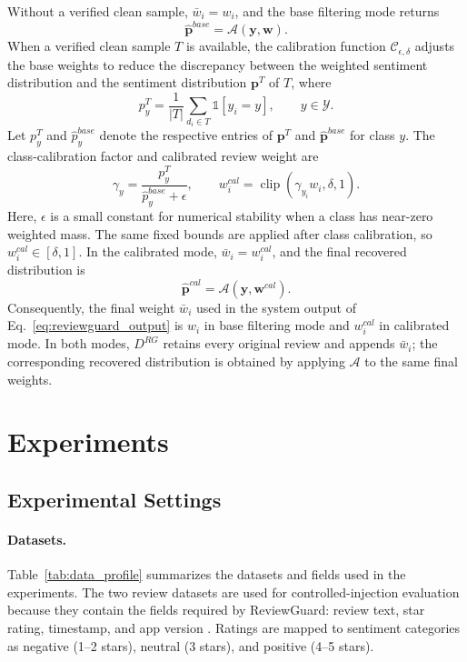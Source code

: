 \documentclass[runningheads]{llncs}
\begin{document}
Without a verified clean sample, \(\bar{w}_i=w_i\), and the base filtering mode returns
\[
\hat{\mathbf{p}}^{base}=\mathcal{A}(\mathbf{y},\mathbf{w}).
\]
When a verified clean sample \(T\) is available, the calibration function \(\mathcal{C}_{\epsilon,\delta}\) adjusts the base weights to reduce the discrepancy between the weighted sentiment distribution and the sentiment distribution \(\mathbf{p}^{T}\) of \(T\), where
\[
p_y^{T}=\frac{1}{|T|}\sum_{d_i\in T}\mathbb{1}[y_i=y],
\qquad y\in\mathcal{Y}.
\]
Let \(p_y^{T}\) and \(\hat{p}^{base}_y\) denote the respective entries of \(\mathbf{p}^{T}\) and \(\hat{\mathbf{p}}^{base}\) for class \(y\). The class-calibration factor and calibrated review weight are
\[
\gamma_y=\frac{p_y^{T}}{\hat{p}^{base}_y+\epsilon},
\qquad
w_i^{cal}=\operatorname{clip}(\gamma_{y_i}w_i,\delta,1).
\]
Here, \(\epsilon\) is a small constant for numerical stability when a class has near-zero weighted mass. The same fixed bounds are applied after class calibration, so \(w_i^{cal}\in[\delta,1]\). In the calibrated mode, \(\bar{w}_i=w_i^{cal}\), and the final recovered distribution is
\[
\hat{\mathbf{p}}^{cal}
=\mathcal{A}(\mathbf{y},\mathbf{w}^{cal}).
\]
Consequently, the final weight \(\bar{w}_i\) used in the system output of Eq.~\ref{eq:reviewguard_output} is \(w_i\) in base filtering mode and \(w_i^{cal}\) in calibrated mode. In both modes, \(D^{RG}\) retains every original review and appends \(\bar{w}_i\); the corresponding recovered distribution is obtained by applying \(\mathcal{A}\) to the same final weights.

\section{Experiments}

\subsection{Experimental Settings}

\paragraph{Datasets.}
Table~\ref{tab:data_profile} summarizes the datasets and fields used in the experiments. The two review datasets are used for controlled-injection evaluation because they contain the fields required by ReviewGuard: review text, star rating, timestamp, and app version \cite{kaggleUberReviews,kaggleGooglePlayApps}. Ratings are mapped to sentiment categories as negative (1--2 stars), neutral (3 stars), and positive (4--5 stars).
\end{document}
